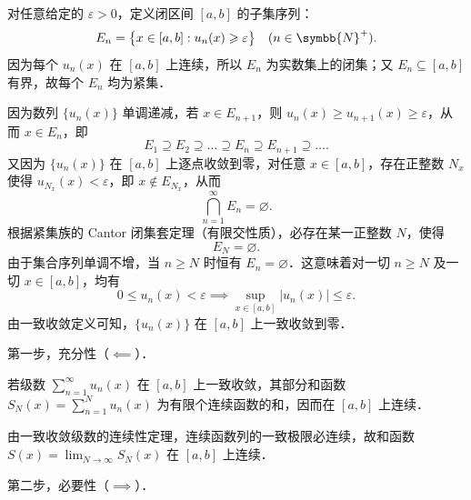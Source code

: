 \begin{myproof}

    对任意给定的 $\varepsilon > 0$，定义闭区间 $[a, b]$ 的子集序列：
    \begin{equation}
        E_n = \bigl\{ x \in [a, b] : u_n(x) \geqslant \varepsilon \bigr\} \quad (n \in \symbb{N}^+).
    \end{equation}
    因为每个 $u_n(x)$ 在 $[a, b]$ 上连续，所以 $E_n$ 为实数集上的闭集；又 $E_n \subseteq [a, b]$ 有界，故每个 $E_n$ 均为紧集．

    因为数列 $\{u_n(x)\}$ 单调递减，若 $x \in E_{n+1}$，则 $u_n(x) \geqslant u_{n+1}(x) \geqslant \varepsilon$，从而 $x \in E_n$，即
    \begin{equation}
        E_1 \supseteq E_2 \supseteq \dots \supseteq E_n \supseteq E_{n+1} \supseteq \dots.
    \end{equation}
    又因为 $\{u_n(x)\}$ 在 $[a, b]$ 上逐点收敛到零，对任意 $x \in [a, b]$，存在正整数 $N_x$ 使得 $u_{N_x}(x) < \varepsilon$，即 $x \notin E_{N_x}$，从而
    \begin{equation}
        \bigcap_{n=1}^\infty E_n = \varnothing.
    \end{equation}
    根据紧集族的 Cantor 闭集套定理（有限交性质），必存在某一正整数 $N$，使得
    \begin{equation}
        E_N = \varnothing.
    \end{equation}
    由于集合序列单调不增，当 $n \geqslant N$ 时恒有 $E_n = \varnothing$．这意味着对一切 $n \geqslant N$ 及一切 $x \in [a, b]$，均有
    \begin{equation}
        0 \leqslant u_n(x) < \varepsilon \implies \sup_{x \in [a, b]} |u_n(x)| \leqslant \varepsilon.
    \end{equation}
    由一致收敛定义可知，$\{u_n(x)\}$ 在 $[a, b]$ 上一致收敛到零．


    第一步，充分性（$\impliedby$）．

    若级数 $\sum_{n=1}^\infty u_n(x)$ 在 $[a, b]$ 上一致收敛，其部分和函数 $S_N(x) = \sum_{n=1}^N u_n(x)$ 为有限个连续函数的和，因而在 $[a, b]$ 上连续．

    由一致收敛级数的连续性定理，连续函数列的一致极限必连续，故和函数 $S(x) = \lim_{N\to\infty} S_N(x)$ 在 $[a, b]$ 上连续．

    第二步，必要性（$\implies$）．


\end{myproof}
